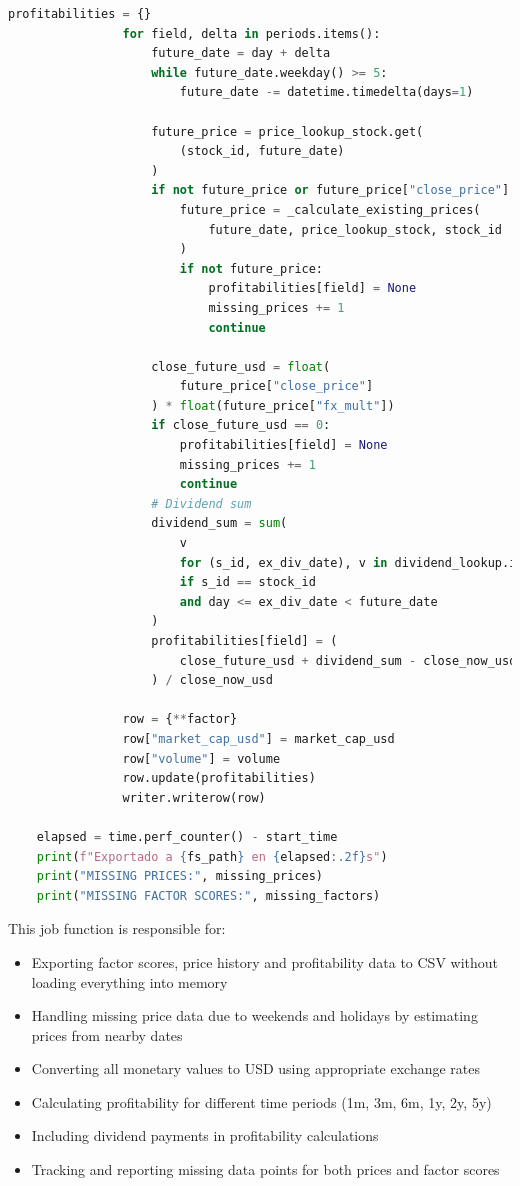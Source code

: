 \documentclass[11pt,english,a4paper,hidelinks]{book}
\begin{document}
\begin{lstlisting}[language=Python, caption=Data Export Job Implementation]
                profitabilities = {}
                for field, delta in periods.items():
                    future_date = day + delta
                    while future_date.weekday() >= 5:
                        future_date -= datetime.timedelta(days=1)

                    future_price = price_lookup_stock.get(
                        (stock_id, future_date)
                    )
                    if not future_price or future_price["close_price"] is None:
                        future_price = _calculate_existing_prices(
                            future_date, price_lookup_stock, stock_id
                        )
                        if not future_price:
                            profitabilities[field] = None
                            missing_prices += 1
                            continue

                    close_future_usd = float(
                        future_price["close_price"]
                    ) * float(future_price["fx_mult"])
                    if close_future_usd == 0:
                        profitabilities[field] = None
                        missing_prices += 1
                        continue
                    # Dividend sum
                    dividend_sum = sum(
                        v
                        for (s_id, ex_div_date), v in dividend_lookup.items()
                        if s_id == stock_id
                        and day <= ex_div_date < future_date
                    )
                    profitabilities[field] = (
                        close_future_usd + dividend_sum - close_now_usd
                    ) / close_now_usd

                row = {**factor}
                row["market_cap_usd"] = market_cap_usd
                row["volume"] = volume
                row.update(profitabilities)
                writer.writerow(row)

    elapsed = time.perf_counter() - start_time
    print(f"Exportado a {fs_path} en {elapsed:.2f}s")
    print("MISSING PRICES:", missing_prices)
    print("MISSING FACTOR SCORES:", missing_factors)
\end{lstlisting}

\noindent This job function is responsible for:
\begin{itemize}
    \item Exporting factor scores, price history and profitability data to CSV without loading everything into memory
    \item Handling missing price data due to weekends and holidays by estimating prices from nearby dates
    \item Converting all monetary values to USD using appropriate exchange rates
    \item Calculating profitability for different time periods (1m, 3m, 6m, 1y, 2y, 5y)
    \item Including dividend payments in profitability calculations
    \item Tracking and reporting missing data points for both prices and factor scores
\end{itemize}
\end{document}
